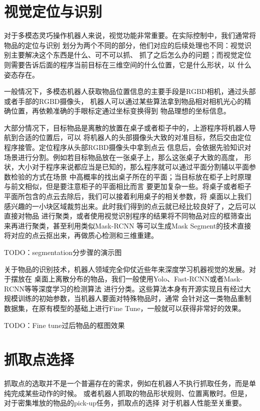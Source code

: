 \section{视觉定位与识别}

对于多模态灵巧操作机器人来说，视觉功能非常重要。在实际控制中，我们通常将物品的定位与识别
划分为两个不同的部分，他们对应的后续处理也不同：视觉识别主要解决这个东西是什么、可不可以抓、
抓了之后怎么办的问题；而视觉定位则需要告诉后面的程序当前目标在三维空间的什么位置，它是什么形状，以
什么姿态存在。

一般情况下，多模态机器人获取物品位置信息的主要手段是RGBD相机，通过头部或者手部的RGBD摄像头，
机器人可以通过某些算法拿到物品相对相机光心的精确位置，再依赖准确的手眼标定通过坐标变换得到
物品理想的坐标信息。

大部分情况下，目标物品是离散的放置在桌子或者柜子中的，上游程序将机器人导航到合适的位置后，可以
将机器人的头部摄像头大致的对准目标，然后交由定位程序接管。定位程序从头部RGBD摄像头中拿到点云
信息后，会依据先验知识对场景进行分割。例如若目标物品放在一张桌子上，那么这张桌子大致的高度，
形状，大小对于程序来说都应当是已知的，那么程序就可以通过平面分割辅以平面参数检验的方式在场景
中高概率的找出桌子所在的平面；当目标放在柜子上时原理与前文相似，但是要注意柜子的平面相比而言
要更加复杂一些。将桌子或者柜子平面所包含的点云去除后，我们可以接着利用桌子的相关参数，将
桌面以上我们感兴趣的一小块区域裁剪出来。此时我们得到的点云就已经比较良好了，之后可以直接对物品
进行聚类，或者使用视觉识别程序的结果将不同物品对应的框筛查出来再进行聚类，甚至利用类似Mask-RCNN
等可以生成Mask Segment的技术直接将对应的点云抠出来，再做质心检测和三维重建。

TODO：segmentation分步骤的演示图

关于物品的识别技术，机器人领域完全仰仗近些年来深度学习机器视觉的发展。对于摆放在
桌面上离散分布的物品，我们一般使用Yolo、Fast-RCNN或者Mask-RCNN等等深度学习的检测算法
进行分类。这些算法本身有开源实现且有经过大规模训练的初始参数，当机器人要面对特殊物品时，通常
会针对这一类物品重制数据集，在原有模型的基础上进行Fine Tune，一般就可以获得非常好的效果。

TODO：Fine tune过后物品的框图效果

\section{抓取点选择}

抓取点的选取并不是一个普遍存在的需求，例如在机器人不执行抓取任务，而是单纯完成某些动作的时候。
或者机器人抓取的物品形状规则、位置离散时。但是，对于密集堆放的物品的pick-up任务，抓取点的选择
对于机器人性能至关重要。

